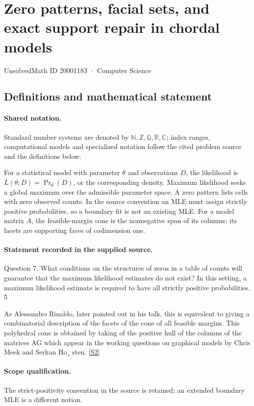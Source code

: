 \documentclass[11pt]{article}
\newcommand{\sref}[2]{\hyperlink{source:#1:#2}{[S#2]}}
\begin{document}
\setcounter{section}{20001182}
\section{Zero patterns, facial sets, and exact support repair in chordal models}\label{20001183}
{\small\sffamily UnsolvedMath ID 20001183 · Computer Science}
\subsection{Definitions and mathematical statement}

\paragraph{Shared notation.}Standard number systems are denoted by $\mathbb N,\mathbb Z,\mathbb Q,\mathbb R,\mathbb C$; index ranges, computational models and specialized notation follow the cited problem source and the definitions below.


For a statistical model with parameter $\theta$ and observations $D$, the likelihood is $L(\theta;D)=\Pr_\theta(D)$, or the corresponding density. Maximum likelihood seeks a global maximum over the admissible parameter space. A zero pattern lists cells with zero observed counts. In the source convention an MLE must assign strictly positive probabilities, so a boundary fit is not an existing MLE. For a model matrix $A$, the feasible-margin cone is the nonnegative span of its columns; its facets are supporting faces of codimension one.
\paragraph{Statement recorded in the supplied source.}
Question 7. What conditions on the structures of zeros in a table of counts will guarantee that the maximum likelihood estimates do not exist? In this setting, a maximum likelihood estimate is required to have all strictly positive probabilities. 5

As Alessandro Rinaldo, later pointed out in his talk, this is equivalent to giving a combinatorial description of the facets of the cone of all feasible margins. This polyhedral cone is obtained by taking of the positive hull of the columns of the matrices AG which appear in the working questions on graphical models by Chris Meek and Serkan Ho¸ sten. \sref{20001183}{2}
\paragraph{Scope qualification.}
The strict-positivity convention in the source is retained; an extended boundary MLE is a different notion.
\end{document}
